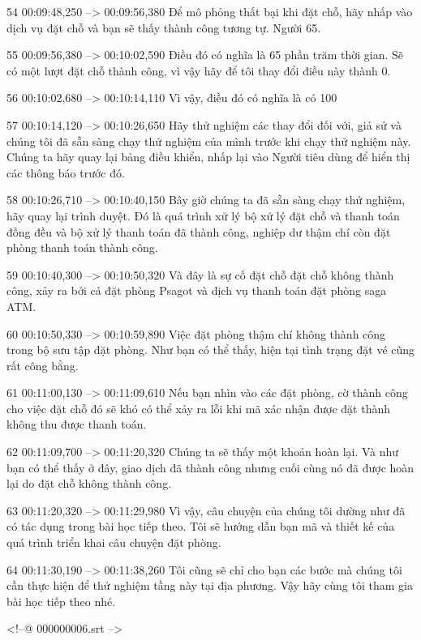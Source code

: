 54
00:09:48,250 --> 00:09:56,380
Để mô phỏng thất bại khi đặt chỗ, hãy nhấp vào dịch vụ đặt chỗ và bạn sẽ thấy thành công tương tự.  Người 65.

55
00:09:56,380 --> 00:10:02,590
Điều đó có nghĩa là 65 phần trăm thời gian.  Sẽ có một lượt đặt chỗ thành công, vì vậy hãy để tôi thay đổi điều này thành 0.

56
00:10:02,680 --> 00:10:14,110
Vì vậy, điều đó có nghĩa là có 100%

57
00:10:14,120 --> 00:10:26,650
Hãy thử nghiệm các thay đổi đối với, giả sử và chúng tôi đã sẵn sàng chạy thử nghiệm của mình trước khi chạy thử nghiệm này.  Chúng ta hãy quay lại bảng điều khiển, nhấp lại vào Người tiêu dùng để hiển thị các thông báo trước đó.

58
00:10:26,710 --> 00:10:40,150
Bây giờ chúng ta đã sẵn sàng chạy thử nghiệm, hãy quay lại trình duyệt.  Đó là quá trình xử lý bộ xử lý đặt chỗ và thanh toán đồng đều và bộ xử lý thanh toán đã thành công, nghiệp dư thậm chí còn đặt phòng thanh toán thành công.

59
00:10:40,300 --> 00:10:50,320
Và đây là sự cố đặt chỗ đặt chỗ không thành công, xảy ra bởi cả đặt phòng Psagot và dịch vụ thanh toán đặt phòng saga ATM.

60
00:10:50,330 --> 00:10:59,890
Việc đặt phòng thậm chí không thành công trong bộ sưu tập đặt phòng.  Như bạn có thể thấy, hiện tại tình trạng đặt vé cũng rất công bằng.

61
00:11:00,130 --> 00:11:09,610
Nếu bạn nhìn vào các đặt phòng, cờ thành công cho việc đặt chỗ đó sẽ khó có thể xảy ra lỗi khi mã xác nhận được đặt thành không thu được thanh toán.

62
00:11:09,700 --> 00:11:20,320
Chúng ta sẽ thấy một khoản hoàn lại.  Và như bạn có thể thấy ở đây, giao dịch đã thành công nhưng cuối cùng nó đã được hoàn lại do đặt chỗ không thành công.

63
00:11:20,320 --> 00:11:29,980
Vì vậy, câu chuyện của chúng tôi dường như đã có tác dụng trong bài học tiếp theo.  Tôi sẽ hướng dẫn bạn mã và thiết kế của quá trình triển khai câu chuyện đặt phòng.

64
00:11:30,190 --> 00:11:38,260
Tôi cũng sẽ chỉ cho bạn các bước mà chúng tôi cần thực hiện để thử nghiệm tầng này tại địa phương.  Vậy hãy cùng tôi tham gia bài học tiếp theo nhé.

<!--@ 000000006.srt -->

